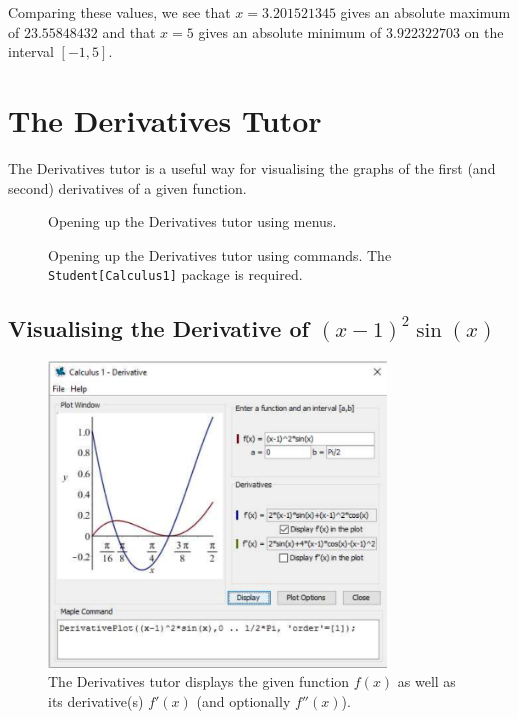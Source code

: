 Comparing these values, we see that $x=3.201521345$ gives an absolute maximum of $23.55848432$ and that $x=5$ gives an absolute minimum of $3.922322703$ on the interval $[-1,5]$.

\clearpage

\section{The Derivatives Tutor}
\label{sec:the_derivatives_tutor}

The Derivatives tutor is a useful way for visualising the graphs of the first (and second) derivatives of a given function.

\begin{figure}[h]
\caption{Opening up the Derivatives tutor using menus.}
\centering
{}
\end{figure}

\begin{figure}[h]
\caption{Opening up the Derivatives tutor using commands. The \texttt{Student[Calculus1]} package is required.}
\centering
{}
\end{figure}

\subsection{Visualising the Derivative of $(x-1)^2\sin(x)$}

\begin{figure}[h]
\caption{The Derivatives tutor displays the given function $f(x)$ as well as its derivative(s) $f'(x)$ (and optionally $f''(x)$).}
\centering
\includegraphics[width=0.8\textwidth]{tutorials/figures/DerivativeTutorQ1-1-eps-converted-to.pdf}
\vspace{-1cm}
\end{figure}

